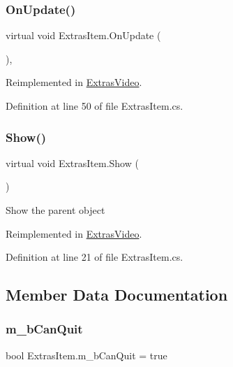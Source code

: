 \subsubsection{\texorpdfstring{On\+Update()}{OnUpdate()}}
{\footnotesize\ttfamily virtual void Extras\+Item.\+On\+Update (\begin{DoxyParamCaption}{ }\end{DoxyParamCaption})\hspace{0.3cm}{\ttfamily [protected]}, {\ttfamily [virtual]}}



Reimplemented in \mbox{\hyperlink{class_extras_video_a95bb26f30ade2007459db62a88285e97}{Extras\+Video}}.



Definition at line 50 of file Extras\+Item.\+cs.

\mbox{\label{class_extras_item_a1ea08ab5d840866f8829d37d8149c277}} 
\subsubsection{\texorpdfstring{Show()}{Show()}}
{\footnotesize\ttfamily virtual void Extras\+Item.\+Show (\begin{DoxyParamCaption}{ }\end{DoxyParamCaption})\hspace{0.3cm}{\ttfamily [virtual]}}



Show the parent object 



Reimplemented in \mbox{\hyperlink{class_extras_video_a3391788cf3302c1d3dc6eaf4223ea94c}{Extras\+Video}}.



Definition at line 21 of file Extras\+Item.\+cs.



\subsection{Member Data Documentation}
\mbox{\label{class_extras_item_a3310a3d2f1ad04ce95296649223a811e}} 
\subsubsection{\texorpdfstring{m\+\_\+b\+Can\+Quit}{m\_bCanQuit}}
{\footnotesize\ttfamily bool Extras\+Item.\+m\+\_\+b\+Can\+Quit = true\hspace{0.3cm}{\ttfamily [protected]}}



